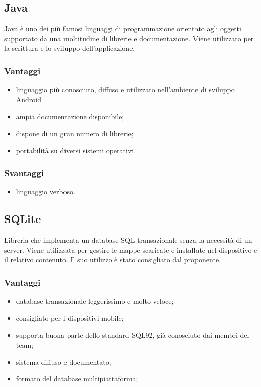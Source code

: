 \documentclass[../SpecificaTecnica.tex]{subfiles}
\begin{document}
	\subsection{Java}
		Java è uno dei più famosi linguaggi di programmazione orientato agli oggetti supportato da una moltitudine di librerie e documentazione. Viene utilizzato per la scrittura e lo sviluppo dell'applicazione.
		\subsubsection{Vantaggi}
		\begin{itemize}
			\item linguaggio più conosciuto, diffuso e utilizzato nell'ambiente di sviluppo Android
			\item ampia documentazione disponibile;
			\item dispone di un gran numero di librerie;
			\item portabilità su diversi sistemi operativi.
		\end{itemize}
		\subsubsection{Svantaggi}
		\begin{itemize}
			\item linguaggio verboso.
		\end{itemize}
		
	\subsection{SQLite}
		Libreria che implementa un database SQL transazionale senza la necessità di un server. Viene utilizzata per gestire le mappe scaricate e installate nel dispositivo e il relativo contenuto. Il suo utilizzo è stato consigliato dal proponente.
		\subsubsection{Vantaggi}
		\begin{itemize}
			\item database transazionale leggerissimo e molto veloce;
			\item consigliato per i dispositivi mobile;
			\item supporta buona parte dello standard SQL92, già conosciuto dai membri del team;
			\item sistema diffuso e documentato;
			\item formato del database multipiattaforma;
		\end{itemize}
\end{document}
